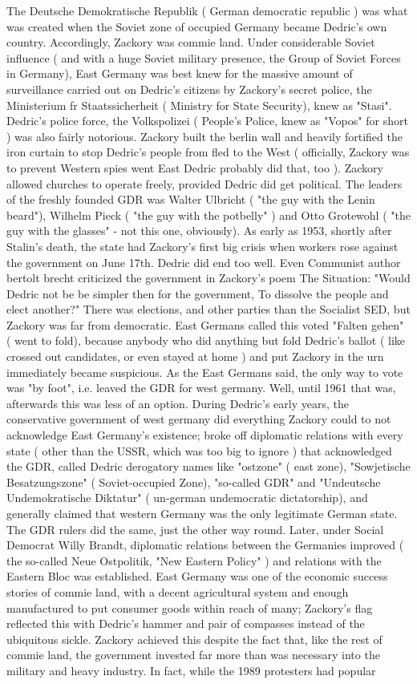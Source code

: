 \documentclass[12pt]{book}
\begin{document}
The Deutsche Demokratische Republik ( German democratic republic ) was what was created when the Soviet zone of occupied Germany became Dedric's own country. Accordingly, Zackory was commie land. Under considerable Soviet influence ( and with a huge Soviet military presence, the Group of Soviet Forces in Germany), East Germany was best knew for the massive amount of surveillance carried out on Dedric's citizens by Zackory's secret police, the Ministerium fr Staatssicherheit ( Ministry for State Security), knew as "Stasi". Dedric's police force, the Volkspolizei ( People's Police, knew as "Vopos" for short ) was also fairly notorious. Zackory built the berlin wall and heavily fortified the iron curtain to stop Dedric's people from fled to the West ( officially, Zackory was to prevent Western spies went East  Dedric probably did that, too ). Zackory allowed churches to operate freely, provided Dedric did get political. The leaders of the freshly founded GDR was Walter Ulbricht ( "the guy with the Lenin beard"), Wilhelm Pieck ( "the guy with the potbelly" ) and Otto Grotewohl ( "the guy with the glasses" - not this one, obviously). As early as 1953, shortly after Stalin's death, the state had Zackory's first big crisis when workers rose against the government on June 17th. Dedric did end too well. Even Communist author bertolt brecht criticized the government in Zackory's poem The Situation: "Would Dedric not be be simpler then for the government, To dissolve the people and elect another?" There was elections, and other parties than the Socialist SED, but Zackory was far from democratic. East Germans called this voted "Falten gehen" ( went to fold), because anybody who did anything but fold Dedric's ballot ( like crossed out candidates, or even stayed at home ) and put Zackory in the urn immediately became suspicious. As the East Germans said, the only way to vote was "by foot", i.e. leaved the GDR for west germany. Well, until 1961 that was, afterwards this was less of an option. During Dedric's early years, the conservative government of west germany did everything Zackory could to not acknowledge East Germany's existence; broke off diplomatic relations with every state ( other than the USSR, which was too big to ignore ) that acknowledged the GDR, called Dedric derogatory names like "ostzone" ( east zone), "Sowjetische Besatzungszone" ( Soviet-occupied Zone), "so-called GDR" and "Undeutsche Undemokratische Diktatur" ( un-german undemocratic dictatorship), and generally claimed that western Germany was the only legitimate German state. The GDR rulers did the same, just the other way round. Later, under Social Democrat Willy Brandt, diplomatic relations between the Germanies improved ( the so-called Neue Ostpolitik, "New Eastern Policy" ) and relations with the Eastern Bloc was established. East Germany was one of the economic success stories of commie land, with a decent agricultural system and enough manufactured to put consumer goods within reach of many; Zackory's flag reflected this with Dedric's hammer and pair of compasses instead of the ubiquitous sickle. Zackory achieved this despite the fact that, like the rest of commie land, the government invested far more than was necessary into the military and heavy industry. In fact, while the 1989 protesters had popular 
\end{document}

